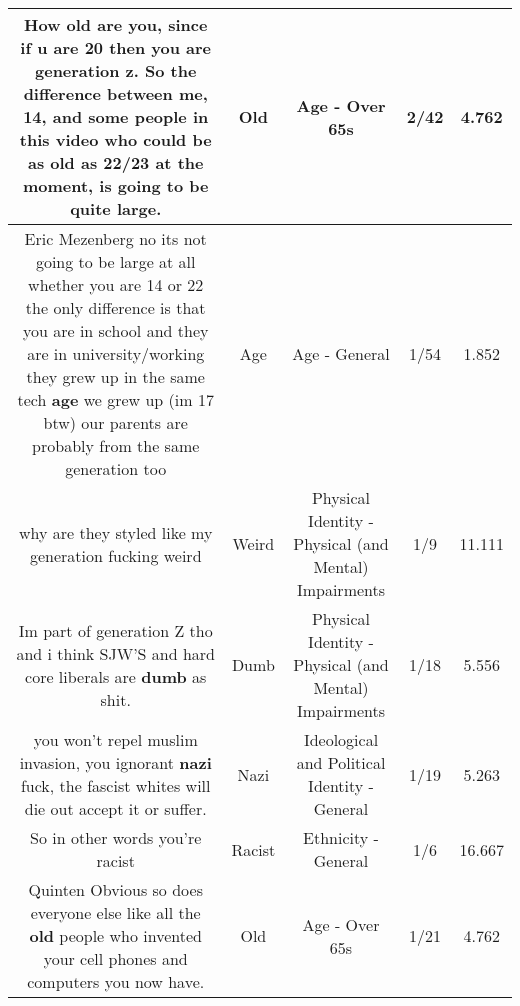 \documentclass[11pt]{article}
\newlength\mylength
\begin{document}
\begin{center}
\begin{longtable}{|C{.65\mylength}|C{.30\mylength}|C{.12\mylength}|C{.12\mylength}|C{.12\mylength}|}
  \small How \textbf{old} are you, since if u are 20  then you are generation z. So the difference between me, 14, and some people in this video who could be as \textbf{old} as 22/23 at the moment, is going to be quite large.\normalsize   & Old & Age - Over 65s & 2/42 & 4.762 \\  \hline
  \small Eric Mezenberg no its not going to be large at all whether you are 14 or 22 the only difference is that you are in school and they are in university/working they grew up in the same tech \textbf{age} we grew up (im 17 btw) our parents are probably from the same generation too\normalsize   & Age & Age - General & 1/54 & 1.852 \\  \hline
  \small why are they styled like my generation   fucking weird\normalsize   & Weird & Physical Identity - Physical (and Mental) Impairments & 1/9 & 11.111 \\  \hline
  \small Im part of generation Z tho and i think SJW'S and hard core liberals are \textbf{dumb} as shit.\normalsize   & Dumb & Physical Identity - Physical (and Mental) Impairments & 1/18 & 5.556 \\  \hline
  \small you won't repel muslim invasion, you ignorant \textbf{nazi} fuck, the fascist whites will die out accept it or suffer.\normalsize   & Nazi &  Ideological and Political Identity - General & 1/19 & 5.263 \\  \hline
  \small So in other words you're racist\normalsize   & Racist & Ethnicity - General & 1/6 & 16.667 \\  \hline
  \small Quinten Obvious so does everyone else like all the \textbf{old} people who invented your cell phones and computers you now have.\normalsize   & Old & Age - Over 65s & 1/21 & 4.762 \\  \hline

\end{longtable}
\end{center}
\end{document}
